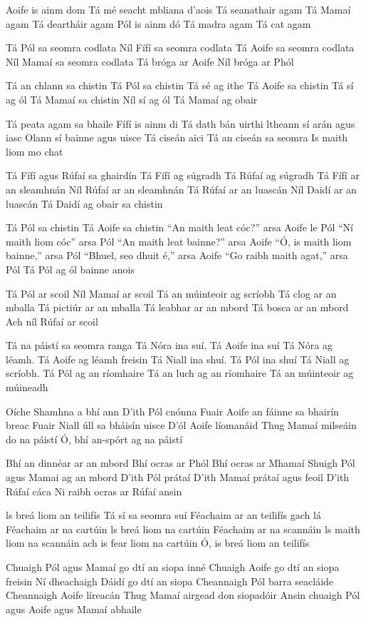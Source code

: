 Aoife is  ainm dom
Tá mé seacht mbliana d’aois
Tá seanathair agam
Tá Mamaí agam
Tá deartháir agam
Pól is ainm dó
Tá madra agam 
Tá cat agam

Tá Pól sa seomra codlata 
Níl Fífí sa seomra codlata
Tá Aoife sa seomra codlata
Níl Mamaí sa seomra codlata
Tá bróga ar Aoife
Níl bróga ar Phól

Tá an chlann sa chistin
Tá Pól sa chistin
Tá sé ag ithe
Tá Aoife sa chistin
Tá sí ag ól
Tá Mamaí sa chistin
Níl sí ag ól
Tá Mamaí ag obair

Tá peata agam sa bhaile
Fífí is ainm di
Tá dath bán uirthi
ltheann sí arán agus iasc
Olann sí bainne agus uisce
Tá ciseán aici
Tá an ciseán sa seomra
Is maith liom mo chat

Tá Fífí agus Rúfaí sa ghairdín
Tá Fífí ag súgradh
Tá Rúfaí ag súgradh
Tá Fífí ar an sleamhnán
Níl Rúfaí ar an sleamhnán
Tá Rúfaí ar an luascán
Níl Daidí ar an luascán
Tá Daidí ag obair sa chistin


Tá Pól sa chistin
Tá Aoife sa chistin
“An maith leat cóc?” arsa Aoife le Pól
“Ní maith liom cóc” arsa Pól
“An maith leat bainne?” arsa Aoife
“Ó, is maith liom bainne,” arsa Pól
“Bhuel, seo dhuit é,” arsa Aoife
“Go raibh maith agat,” arsa Pól
Tá Pól ag ól bainne anois

Tá Pól ar scoil
Níl Mamaí ar scoil
Tá an múinteoir ag scríobh
Tá clog ar an mballa
Tá pictiúr ar an mballa
Tá leabhar ar an mbord
Tá bosca ar an mbord
Ach níl Rúfaí ar scoil

Tá na páistí sa seomra ranga
Tá Nóra ina suí. Tá Aoife ina suí
Tá Nóra ag léamh. Tá Aoife ag léamh freisin
Tá Niall ina shuí. Tá Pól ina shuí
Tá Niall ag scríobh.  Tá Pól ag an ríomhaire
Tá an luch ag an ríomhaire
Tá an múinteoir ag múineadh

Oíche  Shamhna a bhí ann
D’ith Pól cnónna
Fuair Aoife an fáinne sa bhairín breac
Fuair Niall úll sa bháisín uisce
D’ól Aoife líomanáid
Thug Mamaí milseáin do na páistí
Ó, bhí an-spórt ag na páistí

Bhí an dinnéar ar an mbord
Bhí ocras ar Phól
Bhí ocras ar Mhamaí
Shuigh Pól agus Mamai ag an mbord
D’ith Pól prátaí
D'ith Mamaí prátaí agus feoil
D’ith Rúfaí cáca
Ni raibh ocras ar Rúfaí ansin

ls breá liom an teilifís
Tá sí sa seomra suí
Féachaim ar an teilifís gach lá
Féachaim ar na cartúin
ls breá liom na cartúin
Féachaim ar na scannáin
ls maith liom na scannáin ach is fear liom na cartúin
Ó, is breá liom an teilifís

Chuaigh Pól agus Mamaí go dtí an siopa inné
Chuaigh Aoife go dtí an siopa freisin
Ní dheachaigh Dáidí go dtí an siopa
Cheannaigh Pól barra seacláide
Cheannaigh Aoife líreacán
Thug Mamaí airgead don siopadóir
Ansin chuaigh Pól agus Aoife agus Mamaí abhaile

